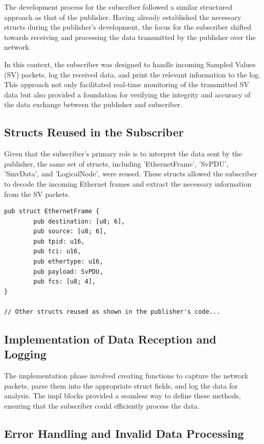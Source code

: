 The development process for the subscriber followed a similar structured approach as that of the publisher. Having already established the necessary structs during the publisher's development, the focus for the subscriber shifted towards receiving and processing the data transmitted by the publisher over the network.

In this context, the subscriber was designed to handle incoming Sampled Values (SV) packets, log the received data, and print the relevant information to the log. This approach not only facilitated real-time monitoring of the transmitted SV data but also provided a foundation for verifying the integrity and accuracy of the data exchange between the publisher and subscriber.

\subsection{Structs Reused in the Subscriber}

Given that the subscriber's primary role is to interpret the data sent by the publisher, the same set of structs, including 'EthernetFrame', 'SvPDU', 'SmvData', and 'LogicalNode', were reused. These structs allowed the subscriber to decode the incoming Ethernet frames and extract the necessary information from the SV packets.

\begin{lstlisting}[caption={EthernetFrame struct. }]
	pub struct EthernetFrame {
		pub destination: [u8; 6],
		pub source: [u8; 6],
		pub tpid: u16,
		pub tci: u16,
		pub ethertype: u16,
		pub payload: SvPDU,
		pub fcs: [u8; 4],
}

// Other structs reused as shown in the publisher's code...
\end{lstlisting}

\subsection{Implementation of Data Reception and Logging}

The implementation phase involved creating functions to capture the network packets, parse them into the appropriate struct fields, and log the data for analysis. The impl blocks provided a seamless way to define these methods, ensuring that the subscriber could efficiently process the data.

\subsection{Error Handling and Invalid Data Processing}

